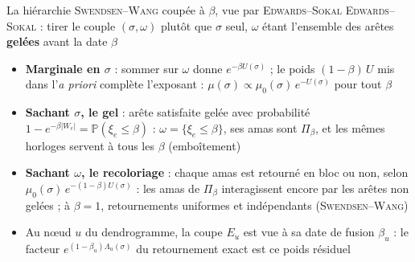 \begin{frame}[t]{La hiérarchie \textsc{Swendsen}--\textsc{Wang} coupée à $\beta$, vue par \textsc{Edwards}--\textsc{Sokal}}
    \footnotesize
    \textsc{Edwards}--\textsc{Sokal}  : tirer le couple $(\sigma, \omega)$ plutôt que $\sigma$ seul,
    $\omega$ étant l'ensemble des arêtes \textbf{gelées} avant la date $\beta$

    \vspace{0.12cm}
    \begin{center}
    \end{center}

    \vspace{0.08cm}
    \begin{itemize}
        \setlength{\itemsep}{3pt}
        \item \textbf{Marginale en $\sigma$} : sommer sur $\omega$ donne $e^{-\beta U(\sigma)}$ ; le poids $(1-\beta)\,U$
        mis dans l'\emph{a priori} complète l'exposant : $\mu(\sigma) \propto \mu_0(\sigma)\, e^{-U(\sigma)}$ pour tout $\beta$
        \item \textbf{Sachant $\sigma$, le gel} : arête satisfaite gelée avec probabilité
        $1 - e^{-\beta|W_e|} = \mathbb P(\xi_e \le \beta)$ : $\omega = \{\xi_e \le \beta\}$, ses amas sont $\Pi_\beta$,
        et les mêmes horloges servent à tous les $\beta$ (emboîtement)
        \item \textbf{Sachant $\omega$, le recoloriage} : chaque amas est retourné en bloc ou non, selon
        $\mu_0(\sigma)\, e^{-(1-\beta)U(\sigma)}$ : les amas de $\Pi_\beta$ interagissent encore par les arêtes non gelées ;
        à $\beta = 1$, retournements uniformes et indépendants (\textsc{Swendsen}--\textsc{Wang})
        \item Au nœud $u$ du dendrogramme, la coupe $E_u$ est vue à sa date de fusion $\beta_u$ : le facteur
        $e^{(1-\beta_u)\Lambda_u(\sigma)}$ du retournement exact est ce poids résiduel 
    \end{itemize}
\end{frame}

